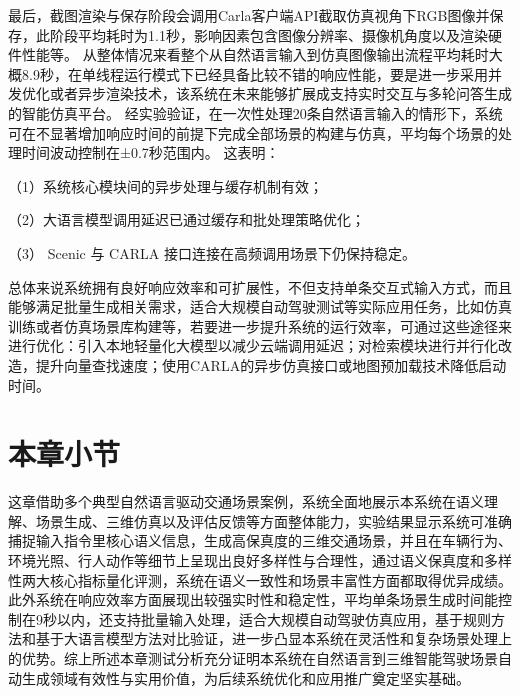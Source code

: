 最后，截图渲染与保存阶段会调用Carla客户端API截取仿真视角下RGB图像并保存，此阶段平均耗时为1.1秒，影响因素包含图像分辨率、摄像机角度以及渲染硬件性能等。
从整体情况来看整个从自然语言输入到仿真图像输出流程平均耗时大概8.9秒，在单线程运行模式下已经具备比较不错的响应性能，要是进一步采用并发优化或者异步渲染技术，该系统在未来能够扩展成支持实时交互与多轮问答生成的智能仿真平台。
经实验验证，在一次性处理20条自然语言输入的情形下，系统可在不显著增加响应时间的前提下完成全部场景的构建与仿真，平均每个场景的处理时间波动控制在±0.7秒范围内。
这表明：

（1）系统核心模块间的异步处理与缓存机制有效；

（2）大语言模型调用延迟已通过缓存和批处理策略优化；

（3） Scenic 与 CARLA 接口连接在高频调用场景下仍保持稳定。

总体来说系统拥有良好响应效率和可扩展性，不但支持单条交互式输入方式，而且能够满足批量生成相关需求，适合大规模自动驾驶测试等实际应用任务，比如仿真训练或者仿真场景库构建等，若要进一步提升系统的运行效率，可通过这些途径来进行优化：引入本地轻量化大模型以减少云端调用延迟；对检索模块进行并行化改造，提升向量查找速度；使用CARLA的异步仿真接口或地图预加载技术降低启动时间。


\section{本章小节}
这章借助多个典型自然语言驱动交通场景案例，系统全面地展示本系统在语义理解、场景生成、三维仿真以及评估反馈等方面整体能力，实验结果显示系统可准确捕捉输入指令里核心语义信息，生成高保真度的三维交通场景，并且在车辆行为、环境光照、行人动作等细节上呈现出良好多样性与合理性，通过语义保真度和多样性两大核心指标量化评测，系统在语义一致性和场景丰富性方面都取得优异成绩。
此外系统在响应效率方面展现出较强实时性和稳定性，平均单条场景生成时间能控制在9秒以内，还支持批量输入处理，适合大规模自动驾驶仿真应用，基于规则方法和基于大语言模型方法对比验证，进一步凸显本系统在灵活性和复杂场景处理上的优势。综上所述本章测试分析充分证明本系统在自然语言到三维智能驾驶场景自动生成领域有效性与实用价值，为后续系统优化和应用推广奠定坚实基础。












